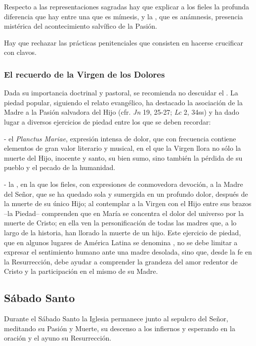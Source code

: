 \begin{introstyle}
Respecto a las representaciones sagradas hay que explicar a los fieles la profunda diferencia que hay entre una  que es mímesis, y la , que es anámnesis, presencia mistérica del acontecimiento salvífico de la Pasión.

Hay que rechazar las prácticas penitenciales que consisten en hacerse crucificar con clavos.

\subsubsection{El recuerdo de la Virgen de los Dolores}

Dada su importancia doctrinal y pastoral, se recomienda no descuidar el . La piedad popular, siguiendo el relato evangélico, ha destacado la asociación de la Madre a la Pasión salvadora del Hijo (cfr. \textit{Jn} 19, 25-27; \textit{Lc} 2, 34ss) y ha dado lugar a diversos ejercicios de piedad entre los que se deben recordar:

- el \textit{Planctus Mariae}, expresión intensa de dolor, que con frecuencia contiene elementos de gran valor literario y musical, en el que la Virgen llora no sólo la muerte del Hijo, inocente y santo, su bien sumo, sino también la pérdida de su pueblo y el pecado de la humanidad.

- la , en la que los fieles, con expresiones de conmovedora devoción,  a la Madre del Señor, que se ha quedado sola y sumergida en un profundo dolor, después de la muerte de su único Hijo; al contemplar a la Virgen con el Hijo entre sus brazos –la Piedad– comprenden que en María se concentra el dolor del universo por la muerte de Cristo; en ella ven la personificación de todas las madres que, a lo largo de la historia, han llorado la muerte de un hijo. Este ejercicio de piedad, que en algunos lugares de América Latina se denomina , no se debe limitar a expresar el sentimiento humano ante una madre desolada, sino que, desde la fe en la Resurrección, debe ayudar a comprender la grandeza del amor redentor de Cristo y la participación en el mismo de su Madre.

\subsection{Sábado Santo} 

Durante el Sábado Santo la Iglesia permanece junto al sepulcro del Señor, meditando su Pasión y Muerte, su descenso a los infiernos y esperando en la oración y el ayuno su Resurrección.


\end{introstyle}
